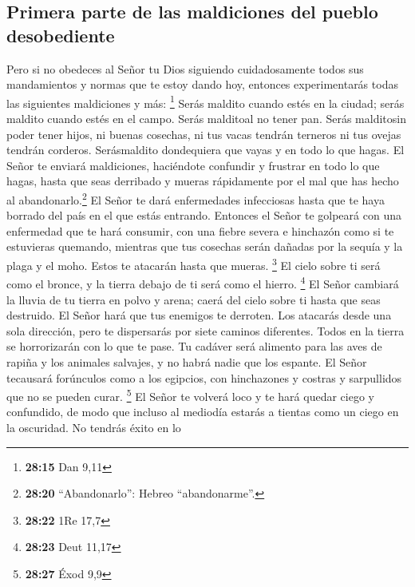 \hypertarget{primera-parte-de-las-maldiciones-del-pueblo-desobediente}{%
\subsection{Primera parte de las maldiciones del pueblo
desobediente}\label{primera-parte-de-las-maldiciones-del-pueblo-desobediente}}

 Pero si no obedeces al Señor tu Dios siguiendo
cuidadosamente todos sus mandamientos y normas que te estoy dando hoy,
entonces experimentarás todas las siguientes maldiciones y más:
\footnote{\textbf{28:15} Dan 9,11}  Serás maldito cuando
estés en la ciudad; serás maldito cuando estés en el campo.
 Serás malditoal no tener pan.  Serás
malditosin poder tener hijos, ni buenas cosechas, ni tus vacas tendrán
terneros ni tus ovejas tendrán corderos.  Serásmaldito
dondequiera que vayas y en todo lo que hagas.  El Señor
te enviará maldiciones, haciéndote confundir y frustrar en todo lo que
hagas, hasta que seas derribado y mueras rápidamente por el mal que has
hecho al abandonarlo.\footnote{\textbf{28:20} ``Abandonarlo'': Hebreo
  ``abandonarme''.}  El Señor te dará enfermedades
infecciosas hasta que te haya borrado del país en el que estás entrando.
 Entonces el Señor te golpeará con una enfermedad que te
hará consumir, con una fiebre severa e hinchazón como si te estuvieras
quemando, mientras que tus cosechas serán dañadas por la sequía y la
plaga y el moho. Estos te atacarán hasta que mueras. \footnote{\textbf{28:22}
  1Re 17,7}  El cielo sobre ti será como el bronce, y la
tierra debajo de ti será como el hierro. \footnote{\textbf{28:23} Deut
  11,17}  El Señor cambiará la lluvia de tu tierra en
polvo y arena; caerá del cielo sobre ti hasta que seas destruido.
 El Señor hará que tus enemigos te derroten. Los atacarás
desde una sola dirección, pero te dispersarás por siete caminos
diferentes. Todos en la tierra se horrorizarán con lo que te pase.
 Tu cadáver será alimento para las aves de rapiña y los
animales salvajes, y no habrá nadie que los espante.  El
Señor tecausará forúnculos como a los egipcios, con hinchazones y
costras y sarpullidos que no se pueden curar. \footnote{\textbf{28:27}
  Éxod 9,9}  El Señor te volverá loco y te hará quedar
ciego y confundido,  de modo que incluso al mediodía
estarás a tientas como un ciego en la oscuridad. No tendrás éxito en lo
